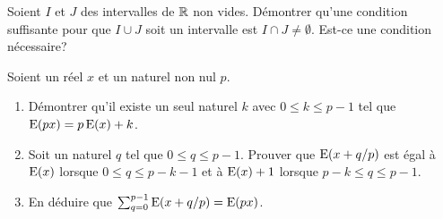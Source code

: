 \begin{exercice}
    Soient \(I\) et \(J\) des intervalles de \(\mathbb{R}\) non vides. Démontrer qu'une condition suffisante pour que \(I \cup J\) soit un intervalle est \(I \cap J \neq \emptyset\). Est-ce une condition nécessaire?
\end{exercice}
\begin{exercice}
    Soient un réel \(x\) et un naturel non nul \(p\).
    \begin{enumerate}
        \item Démontrer qu'il existe un seul naturel \(k\) avec \(0 \leqslant k \leqslant p-1\) tel que \(\operatorname{E}(px) = p\operatorname{E}(x)+k\).
        \item Soit un naturel \(q\) tel que \(0 \leqslant q \leqslant p-1\). Prouver que \(\operatorname{E}(x+q/p)\) est égal à \(\operatorname{E}(x)\) lorsque \(0 \leqslant q \leqslant p-k-1\) et à \(\operatorname{E}(x)+1\) lorsque \(p-k\leqslant q \leqslant p-1\).
        \item En déduire que \(\sum_{q=0}^{p-1} \operatorname{E}(x+q/p) = \operatorname{E}(px)\).
    \end{enumerate}
\end{exercice}

